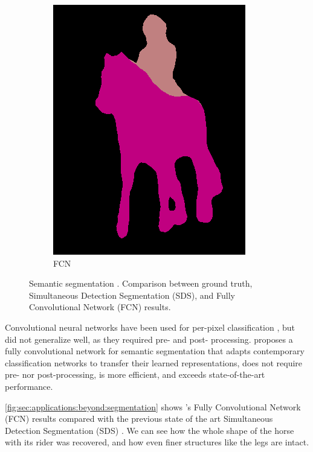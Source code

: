 \begin{figure}[t]
\begin{subfigure}[b]{0.244\textwidth}
    \includegraphics[width=\textwidth]{gfx/app-segmentation-4}
    \caption{FCN \cite{Long2015}}
  \end{subfigure}
  \caption{
    Semantic segmentation \cite{Long2015}.
    Comparison between ground truth, Simultaneous Detection Segmentation (SDS), and Fully Convolutional Network (FCN) results.
  }
  \label{fig:sec:applications:beyond:segmentation}
\end{figure}

Convolutional neural networks have been used for per-pixel classification \cite{Farabet2013,Hariharan2014}, but did not generalize well, as they required pre- and post- processing.
\citet{Long2015} proposes a fully convolutional network for semantic segmentation that adapts contemporary classification networks to transfer their learned representations, does not require pre- nor post-processing, is more efficient, and exceeds state-of-the-art performance.

\autoref{fig:sec:applications:beyond:segmentation} shows \citeauthor{Long2015}'s Fully Convolutional Network (FCN) results compared with the previous state of the art Simultaneous Detection Segmentation (SDS) \cite{Hariharan2014}.
We can see how the whole shape of the horse with its rider was recovered, and how even finer structures like the legs are intact.

